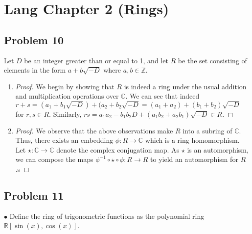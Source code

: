 \documentclass[Lang.tex]{subfiles}
\begin{document}
\section*{Lang Chapter 2 (Rings)}

\subsection{Problem 10}

Let $D$ be an integer greater than or equal to 1, and let $R$ be the set consisting of elements in the form $a + b\sqrt{-D}$ where $a,b \in \mathbb{Z}$.

\begin{enumerate}
	\item 
		\begin{proof}
			We begin by showing that $R$ is indeed a ring under the usual addition and multiplication operations over $\mathbb{C}$. We can see that indeed $r + s = (a_1 + b_1\sqrt{-D}) + (a_2 + b_2\sqrt{-D} = (a_1 + a_2) + (b_1 + b_2)\sqrt{-D}$ for $r,s \in R$. Similarly, $rs = a_1a_2 - b_1b_2D + (a_1b_2 + a_2b_1)\sqrt{-D} \in R$.
			\end{proof}
			\item
				\begin{proof}
						 We observe that the above observations make $R$ into a subring of $\mathbb{C}$. Thus, there exists an embedding $\phi: R \rightarrow \mathbb{C}$ which is a ring homomorphism. Let $\star: \mathbb{C} \rightarrow \mathbb{C}$ denote the complex conjugation map. As $\star$ is an automorphism, we can compose the maps $\phi^{-1} \circ \star \circ \phi: R \rightarrow R$ to yield an automorphism for $R$.s  
				\end{proof}
				
\end{enumerate}

\subsection{Problem 11}
$\bullet$ Define the ring of trigonometric functions as the polynomial ring $\mathbb{R}[\sin(x),\cos(x)]$. 
\end{document}
